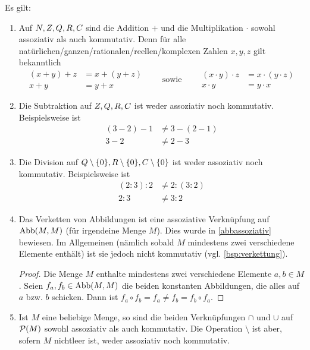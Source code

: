 \begin{bsp}
    Es gilt:
    \begin{enumerate}
        \item Auf $\relax N,\relax Z,\relax Q,\relax R,\relax C$ sind die Addition $+$ und die Multiplikation $\cdot$ sowohl assoziativ als auch kommutativ. Denn für alle natürlichen/ganzen/rationalen/reellen/komplexen Zahlen $x,y,z$ gilt bekanntlich
            \[ \begin{split}
                    (x+y)+z& = x+(y+z)  \\
                x+y     & = y+x
                \end{split} \qquad \text{sowie}\qquad \begin{split}
                    (x\cdot y)\cdot z & = x\cdot (y\cdot z)  \\
                    x\cdot y & = y\cdot x
                \end{split} \]
        \item Die Subtraktion auf $\relax Z,\relax Q,\relax R,\relax C$ ist weder assoziativ noch kommutativ. Beispielsweise ist
        \begin{align*}
            (3-2)-1 &\neq  3-(2-1)  \\
            3-2 &\neq 2-3
        \end{align*}
        \item Die Division auf $\relax Q\setminus \{0\},\relax R\setminus \{0\},\relax C\setminus \{0\}$ ist weder assoziativ noch kommutativ. Beispielsweise ist
        \begin{align*}
            (2:3):2 &\neq 2:(3:2) \\
            2 : 3 & \neq 3:2
        \end{align*}
        \item Das Verketten von Abbildungen ist eine assoziative Verknüpfung auf $\operatorname{Abb}(M,M)$ (für irgendeine Menge $M$). Dies wurde in \cref{abbassoziativ} bewiesen. Im Allgemeinen (nämlich sobald $M$ mindestens zwei verschiedene Elemente enthält) ist sie jedoch nicht kommutativ (vgl. \cref{bsp:verkettung}).
        \begin{proof}
            Die Menge $M$ enthalte mindestens zwei verschiedene Elemente $a,b\in M$. Seien $f_a,f_b\in\operatorname{Abb}(M,M)$ die beiden konstanten Abbildungen, die alles auf $a$ bzw. $b$ schicken. Dann ist $f_a\circ f_b=f_a\neq f_b=f_b\circ f_a$.
        \end{proof}
        \item Ist $M$ eine beliebige Menge, so sind die beiden Verknüpfungen $\cap$ und $\cup$ auf $\mathcal P(M)$ sowohl assoziativ als auch kommutativ. Die Operation $\setminus$ ist aber, sofern $M$ nichtleer ist, weder assoziativ noch kommutativ.
    \end{enumerate}
\end{bsp}


